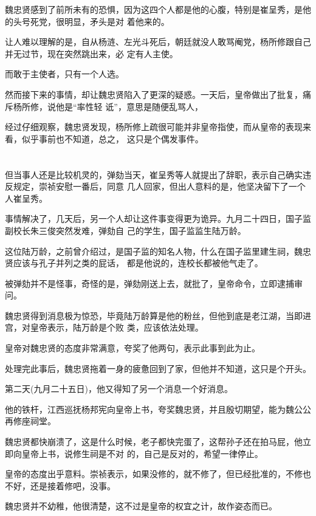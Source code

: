 \documentclass[11pt,a4paper,onecolumn]{article}
\begin{document}
魏忠贤感到了前所未有的恐惧，因为这四个人都是他的心腹，特别是崔呈秀，是他的头号死党，很明显，矛头是对
着他来的。

让人难以理解的是，自从杨涟、左光斗死后，朝廷就没人敢骂阉党，杨所修跟自己并无过节，现在突然跳出来，必
定有人主使。

而敢于主使者，只有一个人选。

然而接下来的事情，却让魏忠贤陷入了更深的疑惑。一天后，皇帝做出了批复，痛斥杨所修，说他是``率性轻
诋''，意思是随便乱骂人，

经过仔细观察，魏忠贤发现，杨所修上疏很可能并非皇帝指使，而从皇帝的表现来看，似乎事前也不知道，总之，
这只是个偶发事件。

\section[\thesection]{}

但当事人还是比较机灵的，弹劾当天，崔呈秀等人就提出了辞职，表示自己确实违反规定，崇祯安慰一番后，同意
几人回家，但出人意料的是，他坚决留下了一个人\myrule 崔呈秀。

事情解决了，几天后，另一个人却让这件事变得更为诡异。九月二十四日，国子监副校长朱三俊突然发难，弹劾自
己的学生，国子监监生陆万龄。

这位陆万龄，之前曾介绍过，是国子监的知名人物，什么在国子监里建生祠，魏忠贤应该与孔子并列之类的屁话，
都是他说的，连校长都被他气走了。

被弹劾并不是怪事，奇怪的是，弹劾刚送上去，就批了，皇帝命令，立即逮捕审问。

魏忠贤得到消息极为惊恐，毕竟陆万龄算是他的粉丝，但他到底是老江湖，当即进宫，对皇帝表示，陆万龄是个败
类，应该依法处理。

皇帝对魏忠贤的态度非常满意，夸奖了他两句，表示此事到此为止。

处理完此事后，魏忠贤拖着一身的疲惫回到了家，但他并不知道，这只是个开头。

第二天(九月二十五日)，他又得知了另一个消息\myrule 一个好消息。

他的铁杆，江西巡抚杨邦宪向皇帝上书，夸奖魏忠贤，并且殷切期望，能为魏公公再修座祠堂。

魏忠贤都快崩溃了，这是什么时候，老子都快完蛋了，这帮孙子还在拍马屁，他立即向皇帝上书，说修生祠是不对
的，自己是反对的，希望一律停止。

皇帝的态度出乎意料。崇祯表示，如果没修的，就不修了，但已经批准的，不修也不好，还是接着修吧，没事。

魏忠贤并不幼稚，他很清楚，这不过是皇帝的权宜之计，故作姿态而已。
\end{document}
